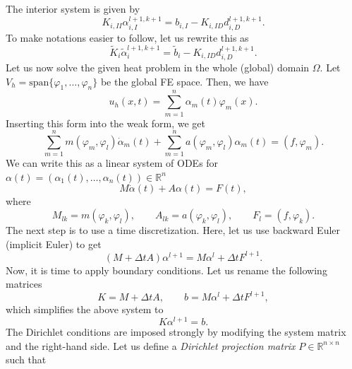 \documentclass[a4paper, 11pt]{article}
\theoremstyle{plain}
\theoremstyle{definition}
\theoremstyle{remark}
\begin{document}
The interior system is given by
\begin{equation*}
    K_{i, II}\alpha_{i, I}^{l+1, k+1} = b_{i, I} - K_{i, ID}d^{l+1, k+1}_{i, D}.
\end{equation*}
To make notations easier to follow, let us rewrite this as
\begin{equation*}
    \boxed{\tilde{K}_{i}\tilde{\alpha}_{i}^{l+1, k+1} = \tilde{b}_{i} - K_{i, ID}d^{l+1, k+1}_{i, D}.}
\end{equation*}
Let us now solve the given heat problem in the whole (global) domain $\Omega$. Let $V_{h} = \text{span}\{\varphi_{1}, \ldots, \varphi_{n}\}$ be the global FE space. Then, we have
\begin{equation*}
    u_{h}(x, t) = \sum_{m = 1}^{n}\alpha_{m}(t)\varphi_{m}(x).
\end{equation*}
Inserting this form into the weak form, we get
\begin{equation*}
    \sum_{m = 1}^{n}m(\varphi_{m}, \varphi_{l})\dot{\alpha}_{m}(t) + \sum_{m = 1}^{n}a(\varphi_{m}, \varphi_{l})\alpha_{m}(t) = (f, \varphi_{m}).
\end{equation*}
We can write this as a linear system of ODEs for $\alpha(t) = \left(\alpha_{1}(t), \ldots, \alpha_{n}(t)\right)\in \mathbb{R}^{n}$
\begin{equation*}
    M\dot{\alpha}(t) + A\alpha(t) = F(t),
\end{equation*}
where
\begin{equation*}
    M_{lk} = m(\varphi_{k}, \varphi_{l}), \qquad A_{lk} = a(\varphi_{k}, \varphi_{l}), \qquad F_{l} = (f, \varphi_{k}).
\end{equation*}
The next step is to use a time discretization. Here, let us use backward Euler (implicit Euler) to get
\begin{equation*}
    \left(M + \Delta t A\right)\alpha^{l+1} = M \alpha^{l} + \Delta tF^{l+1}.
\end{equation*}
Now, it is time to apply boundary conditions. Let us rename the following matrices
\begin{equation*}
    K = M + \Delta t A, \qquad b = M \alpha^{l} + \Delta tF^{l+1}, 
\end{equation*}
which simplifies the above system to
\begin{equation*}
    K\alpha^{l+1} = b.
\end{equation*}
The Dirichlet conditions are imposed strongly by modifying the system matrix and the right-hand side. Let us define a \textit{Dirichlet projection matrix} $P\in \mathbb{R}^{n\times n}$ such that
\end{document}
